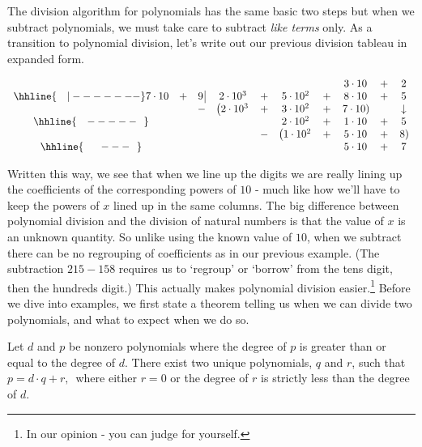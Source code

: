 \smallskip

The division algorithm for polynomials has the same basic two steps but when we subtract polynomials, we must take care to subtract \emph{like terms} only.  As a transition to polynomial division, let's write out our previous division tableau in expanded form.


\setlength\arraycolsep{0.1pt}
\setlength\extrarowheight{2pt}

\[ \begin{array}{cccccccccc}

& & & & & & & 3 \cdot 10 & + & 2 \\ \hhline{~~~|-------}

7 \cdot 10 & + & 9 \, \vline& 2\cdot 10^3 & + & 5 \cdot 10^2 & + & 8 \cdot 10 & + & 5 \\

 &  &  -& \left(2 \cdot 10^3 \right. & + &  3 \cdot 10^2  & + & \left. 7 \cdot 10 \right) &  &  \downarrow \\ \hhline{~~~-----~~} 
 &  &  &   &  & 2 \cdot 10^2 & +  & 1 \cdot 10 & + & 5 \\ 
 &  &  &   & - & \left(1 \cdot 10^2 \right. & +  &  5 \cdot 10 &  + &\left.  8 \right) \\ \hhline{~~~~~---~~} 
 &  &  &   &   &  & & 5 \cdot 10  & + & 7 \\

 
\end{array}\]

\setlength\arraycolsep{5pt}
\setlength\extrarowheight{0pt}

Written this way, we see that when we line up the digits we are really lining up the coefficients of the corresponding powers of $10$ - much like how we'll have to keep the powers of $x$ lined up in the same columns.  The big difference between polynomial division and the division of natural numbers is that the value of $x$ is an unknown quantity.  So unlike using the known value of $10$, when we subtract there can be no regrouping of coefficients as in our previous example. (The subtraction $215 - 158$ requires us to `regroup' or `borrow' from the tens digit, then the hundreds digit.) This actually makes polynomial division easier.\footnote{In our opinion - you can judge for yourself.}  Before we dive into examples, we first state a theorem telling us when we can divide two polynomials, and what to expect when we do so.

\medskip

\colorbox{ResultColor}{\bbm

\begin{thm} \label{polydiv} Let $d$ and $p$ be nonzero polynomials where the degree of $p$ is greater than or equal to the degree of $d$.  There exist two unique polynomials, $q$ and $r$, such that $p = d \cdot q + r,\,$ where either $r = 0$ or the degree of $r$ is strictly less than the degree of $d$.
\end{thm}
\ebm}

